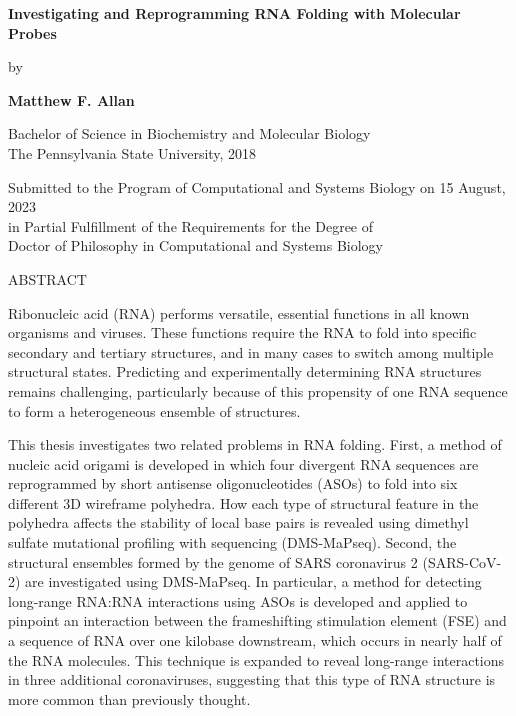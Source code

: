 \documentclass[main.tex]{subfiles}
\begin{document}
\begin{spacing}{1.0}


\begin{center}

\textbf{Investigating and Reprogramming RNA Folding with Molecular Probes}\\

\vspace{0.25cm}

by

\vspace{0.25cm}

\textbf{Matthew F. Allan}

\vspace{0.25cm}

Bachelor of Science in Biochemistry and Molecular Biology\\
The Pennsylvania State University, 2018 

\vspace{1cm}

Submitted to the Program of Computational and Systems Biology on 15 August, 2023\\
in Partial Fulfillment of the Requirements for the Degree of\\
Doctor of Philosophy in Computational and Systems Biology

\vspace{1cm}

\end{center}


\noindent
ABSTRACT

\vspace{0.5cm}

Ribonucleic acid (RNA) performs versatile, essential functions in all known organisms and viruses. These functions require the RNA to fold into specific secondary and tertiary structures, and in many cases to switch among multiple structural states. Predicting and experimentally determining RNA structures remains challenging, particularly because of this propensity of one RNA sequence to form a heterogeneous ensemble of structures.

This thesis investigates two related problems in RNA folding. First, a method of nucleic acid origami is developed in which four divergent RNA sequences are reprogrammed by short antisense oligonucleotides (ASOs) to fold into six different 3D wireframe polyhedra. How each type of structural feature in the polyhedra affects the stability of local base pairs is revealed using dimethyl sulfate mutational profiling with sequencing (DMS-MaPseq). Second, the structural ensembles formed by the genome of SARS coronavirus 2 (SARS-CoV-2) are investigated using DMS-MaPseq. In particular, a method for detecting long-range RNA:RNA interactions using ASOs is developed and applied to pinpoint an interaction between the frameshifting stimulation element (FSE) and a sequence of RNA over one kilobase downstream, which occurs in nearly half of the RNA molecules. This technique is expanded to reveal long-range interactions in three additional coronaviruses, suggesting that this type of RNA structure is more common than previously thought.


\end{spacing}
\end{document}
